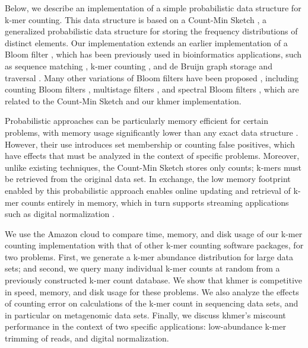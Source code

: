 \documentclass[10pt]{article}
\begin{document}

Below, we describe an implementation of a simple probabilistic data
structure for k-mer counting. This data structure is based on a
Count-Min Sketch \cite{Cormode2005}, a generalized probabilistic data structure for
storing the frequency distributions of distinct elements.
Our implementation extends an earlier
implementation of a Bloom filter \cite{Bloom70}, which has been previously used 
in bioinformatics applications, such as
sequence matching \cite{DBLP:conf/padl/MaldeO09}, k-mer counting \cite{Melsted2011}, 
and de Bruijn graph storage and traversal \cite{Pell2012,Jones:2012aa}.
Many other variations of Bloom filters have been proposed \cite{BroderM03}, including
counting Bloom filters \cite{Fan:2000:SCS:343571.343572}, 
multistage filters \cite{DBLP:conf/sigcomm/EstanV02}, 
and spectral Bloom filters \cite{DBLP:conf/sigmod/CohenM03}, which 
are related to the Count-Min Sketch and our khmer implementation. 
 

Probabilistic approaches can be particularly memory efficient for
certain problems, with memory usage significantly lower than any exact
data structure \cite{Pell2012}.  However, their use introduces set
membership or counting false positives, which have effects that must
be analyzed in the context of specific problems.  Moreover, unlike
existing techniques, the Count-Min Sketch stores only counts; k-mers
must be retrieved from the original data set.  In exchange, the low
memory footprint enabled by this probabilistic approach enables online
updating and retrieval of k-mer counts entirely in memory, which in
turn supports streaming applications such as digital normalization
\cite{Brown2012}.

We use the Amazon cloud to compare time, memory, and disk usage of our
k-mer counting implementation with that of other k-mer counting software packages, 
for two problems. First, we generate a k-mer abundance
distribution for large data sets; and second, we query many individual
k-mer counts at random from a previously constructed k-mer count
database.  We show that khmer is competitive in speed, memory, and
disk usage for these problems.  We also analyze the effects of
counting error on calculations of the k-mer count in sequencing data
sets, and in particular on metagenomic data sets.  Finally, we discuss
khmer's miscount performance in the context of two specific
applications: low-abundance k-mer trimming of reads, and digital
normalization.
\end{document}
